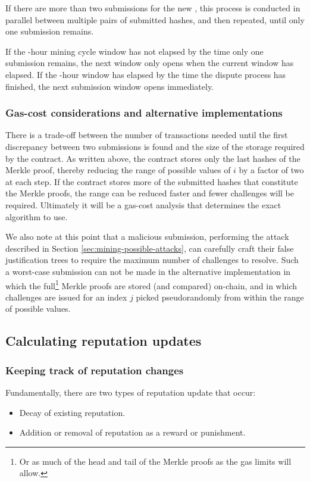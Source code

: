 If there are more than two submissions for the new , this process is conducted in parallel between multiple pairs of submitted hashes, and then repeated, until only one submission remains.

If the \miningcycleduration-hour mining cycle window has not elapsed by the time only one submission remains, the next window only opens when the current window has elapsed. If the \miningcycleduration-hour window has elapsed by the time the dispute process has finished, the next submission window opens immediately.

\subsubsection*{Gas-cost considerations and alternative implementations}
There is a trade-off between the number of transactions needed until the first discrepancy between two submissions is found and the size of the storage required by the contract. As written above, the contract stores only the last hashes of the Merkle proof, thereby reducing the range of possible values of $i$ by a factor of two at each step. If the contract stores more of the submitted hashes that constitute the Merkle proofs, the range can be reduced faster and fewer challenges will be required. Ultimately it will be a gas-cost analysis that determines the exact algorithm to use.

We also note at this point that a malicious submission, performing the attack described in Section \ref{sec:mining-possible-attacks}, can carefully craft their false justification trees to require the maximum number of challenges to resolve. Such a worst-case submission can not be made in the alternative implementation in which the full\footnote{Or as much of the head and tail of the Merkle proofs as the gas limits will allow.} Merkle proofs are stored (and compared) on-chain, and in which challenges are issued for an index $j$ picked pseudorandomly from within the range of possible values.

\subsection{Calculating reputation updates}\label{sec:calculating-reputation-updates}
%
\subsubsection{Keeping track of reputation changes}
%
Fundamentally, there are two types of reputation update that occur:
\begin{itemize}
 \item Decay of existing reputation.
 \item Addition or removal of reputation as a reward or punishment.
\end{itemize}

